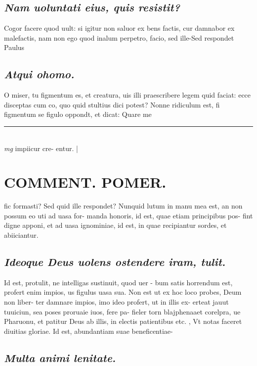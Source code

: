 \documentclass{article}
\begin{document}
\begin{pages}
\subsection*{\textit{Nam uoluntati eius, quis resistit? }}\pstart Cogor facere quod uult: si igitur non saluor ex bens factis, cur damnabor ex malefactis, nam non ego quod inalum perpetro, facio, sed ille-Sed respondet Paulus  \pend
{}
{}
\subsection*{\textit{Atqui ohomo. }}\pstart O miser, tu figmentum es, et creatura, uis illi praescribere legem quid faciat: ecce disceptas cum co, quo quid stultius dici potest? Nonne ridiculum est, fi figmentum se figulo oppondt, et dicat: Quare me  \pend
\vspace{0.5cm}\noindent
\vspace{0.2cm}\rule{1cm}{0.2pt}\\ 
\hspace{0.2cm}\textit{mg}
\footnotesize impiicur cre- entur.  
\normalsize| 
\section*{COMMENT. POMER.  }\pstart fic formasti? Sed quid ille respondet? Nunquid lutum in manu mea est, an non possum eo uti ad uasa for- manda honoris, id est, quae etiam principibus pos- fint digne apponi, et ad uasa ignominiae, id est, in quae recipiantur sordes, et abiiciantur.  \pend
{}
{}
\subsection*{\textit{Ideoque Deus uolens ostendere iram, tulit. }}\pstart Id est, protulit, ne intelligas sustinuit, quod uer - bum satis horrendum est, profert enim impios, us figulus uasa sua.   \pend\pstart Non est ut ex hoc loco probes, Deum non liber- ter damnare impios, imo ideo profert, ut in illis ex- erteat jauut tuuiciun, sea poses proruaie iuos, fere pa- fieler torn blajphenaaet corelpra, ue Pharuonu, et patitur Deus ab illis, in electis patientibus etc. , Vt notas faceret diuitias gloriae. Id est, abundantiam suae beneficentiae-  \pend
{}
{}
\subsection*{\textit{Multa animi lenitate. }}
{}

\end{pages}
\end{document}
